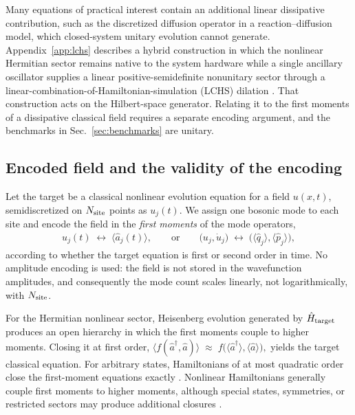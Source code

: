 \documentclass[pra,twocolumn,superscriptaddress,nofootinbib,floatfix]{revtex4-2}
\theoremstyle{remark}
\begin{document}
Many equations of practical interest contain an additional linear dissipative contribution, such as the discretized diffusion operator in a reaction--diffusion model, which closed-system unitary evolution cannot generate. Appendix~\ref{app:lchs} describes a hybrid construction in which the nonlinear Hermitian sector remains native to the system hardware while a single ancillary oscillator supplies a linear positive-semidefinite nonunitary sector through a linear-combination-of-Hamiltonian-simulation (LCHS) dilation \cite{An_2023,An_2026,das2026quantumdifferentialequationsolver}. That construction acts on the Hilbert-space generator. Relating it to the first moments of a dissipative classical field requires a separate encoding argument, and the benchmarks in Sec.~\ref{sec:benchmarks} are unitary.

\subsection{Encoded field and the validity of the encoding}
\label{subsec:encoding}

Let the target be a classical nonlinear evolution equation for a field $u(x,t)$, semidiscretized on $N_{\rm site}$ points as $u_j(t)$. We assign one bosonic mode to each site and encode the field in the \emph{first moments} of the mode operators,
\begin{align}
u_j(t) \;\longleftrightarrow\; \langle \hat a_j(t)\rangle,
\qquad\text{or}\qquad
\bigl(u_j,\dot u_j\bigr) \;\longleftrightarrow\;
\bigl(\langle\hat q_j\rangle,\langle\hat p_j\rangle\bigr),
\label{eq:encoding}
\end{align}
according to whether the target equation is first or second order in time. No amplitude encoding is used: the field is not stored in the wavefunction amplitudes, and consequently the mode count scales linearly, not logarithmically, with $N_{\rm site}$.

For the Hermitian nonlinear sector, Heisenberg evolution generated by $\hat H_{\rm target}$ produces an open hierarchy in which the first moments couple to higher moments. Closing it at first order,
\(\bigl\langle f(\hat a^\dagger,\hat a)\bigr\rangle\;\approx\;f\bigl(\langle\hat a^\dagger\rangle,\langle\hat a\rangle\bigr),\)
yields the target classical equation. For arbitrary states, Hamiltonians of at most quadratic order close the first-moment equations exactly \cite{Adesso_2014}. Nonlinear Hamiltonians generally couple first moments to higher moments, although special states, symmetries, or restricted sectors may produce additional closures \cite{Plankensteiner_2022}.
\end{document}
